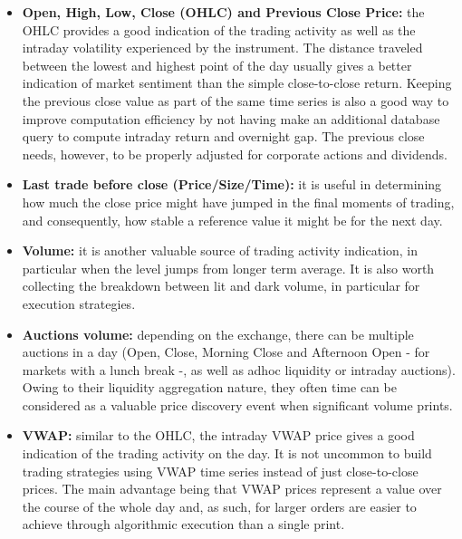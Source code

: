 \begin{itemize}
\item \textbf{Open, High, Low, Close (OHLC) and Previous Close Price:} the OHLC provides a good indication of the trading activity as well as the intraday volatility experienced by the instrument. The distance traveled between the lowest and highest point of the day usually gives a better indication of market sentiment than the simple close-to-close return. Keeping the previous close value as part of the same time series is also a good way to improve computation efficiency by not having make an additional database query to compute intraday return and overnight gap. The previous close needs, however, to be properly adjusted for corporate actions and dividends. 

\item \textbf{Last trade before close (Price/Size/Time):} it is useful in determining how much the close price might have jumped in the final moments of trading, and consequently, how stable a reference value it might be for the next day.

\item \textbf{Volume:} it is another valuable source of trading activity indication, in particular when the level jumps from longer term average. It is also worth collecting the breakdown between lit and dark volume, in particular for execution strategies.

\item \textbf{Auctions volume:} depending on the exchange, there can be multiple auctions in a day (Open, Close, Morning Close and Afternoon Open - for markets with a lunch break -, as well as adhoc liquidity or intraday auctions). Owing to their liquidity aggregation nature, they often time can be considered as a valuable price discovery event when significant volume prints.

\item \textbf{VWAP:} similar to the OHLC, the intraday VWAP price gives a good indication of the trading activity on the day. It is not uncommon to build trading strategies using VWAP time series instead of just close-to-close prices. The main advantage being that VWAP prices represent a value over the course of the whole day and, as such, for larger orders are easier to achieve through algorithmic execution than a single print.


\end{itemize}
